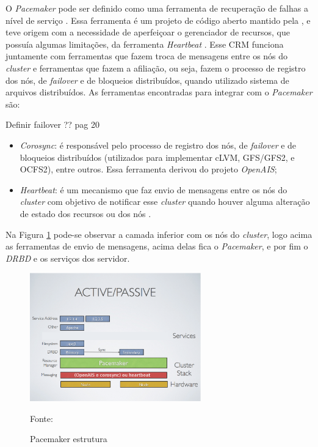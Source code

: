 O \textit{Pacemaker} \cite{pacemaker} pode ser definido como uma ferramenta de recuperação de falhas a nível de serviço \cite{perkov2011}. 
Essa ferramenta é um projeto de código aberto mantido pela \cite{clusterlabs}, e teve origem com a necessidade de aperfeiçoar o gerenciador 
de recursos, que possuía algumas limitações, da ferramenta \textit{Heartbeat} \cite{heartbeat}. Esse \ac{CRM} funciona juntamente com ferramentas
que fazem troca de mensagens entre os nós do \textit{cluster} e ferramentas que fazem a afiliação, ou seja, fazem o processo de registro dos
nós, de \textit{failover} e de bloqueios distribuídos, quando utilizado sistema de arquivos distribuídos. 
As ferramentas encontradas para integrar com o \textit{Pacemaker} são:

Definir failover ??
\cite{bassan2008} pag 20

\begin{itemize}
 \item \textit{Corosync}: é responsável pelo processo de registro dos nós, de \textit{failover} e de bloqueios distribuídos (utilizados para 
 implementar cLVM, GFS/GFS2, e OCFS2), entre outros. Essa ferramenta derivou do projeto \textit{OpenAIS};
 \item \textit{Heartbeat}: é um mecanismo que faz envio de mensagens entre os nós do \textit{cluster} com objetivo de notificar esse 
 \textit{cluster} quando houver alguma alteração de estado dos recursos ou dos nós \cite{clusterlabs}.
\end{itemize}

Na Figura \ref{fig:pacemaker_tools} pode-se observar a camada inferior com os nós do \textit{cluster}, logo acima as ferramentas de envio de 
mensagens, acima delas fica o \textit{Pacemaker}, e por fim o \textit{DRBD} e os serviços dos servidor.

\begin{figure}[h!]
 \centering
 \includegraphics[width=280px]{img/pacemaker_tools.eps}
 \caption{Pacemaker estrutura}
 Fonte: \citet{pacemaker}
 \label{fig:pacemaker_tools}
\end{figure}

